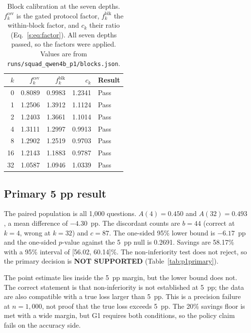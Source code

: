 \begin{table}[pos=htbp]
  \centering
  \caption{Block calibration at the seven depths. $f^{\mathrm{csv}}_k$ is the gated protocol
  factor, $f^{\mathrm{blk}}_k$ the within-block factor, and $c_k$ their ratio
  (Eq.~\ref{s:eq:factor}). All seven depths passed, so the factors were applied. Values are from
  \texttt{runs/squad\_qwen4b\_p1/blocks.json}.}
  \label{tab:p1factors}
  \small
  \setlength{\tabcolsep}{4pt}
  \begin{tabular}{rrrrl}
    \toprule
    \textbf{$k$} & \textbf{$f^{\mathrm{csv}}_k$} & \textbf{$f^{\mathrm{blk}}_k$} & \textbf{$c_k$} & \textbf{Result} \\
    \midrule
    0  & 0.8089 & 0.9983 & 1.2341 & Pass \\
    1  & 1.2506 & 1.3912 & 1.1124 & Pass \\
    2  & 1.2403 & 1.3661 & 1.1014 & Pass \\
    4  & 1.3111 & 1.2997 & 0.9913 & Pass \\
    8  & 1.2902 & 1.2519 & 0.9703 & Pass \\
    16 & 1.2143 & 1.1883 & 0.9787 & Pass \\
    32 & 1.0587 & 1.0946 & 1.0339 & Pass \\
    \bottomrule
  \end{tabular}
\end{table}

\subsection{Primary 5 pp result}

The paired population is all 1{,}000 questions. $A(4)=0.450$ and $A(32)=0.493$, a mean
difference of $-4.30$~pp. The discordant counts are $b=44$ (correct at $k=4$, wrong at $k=32$)
and $c=87$. The one-sided 95\% lower bound is $-6.17$~pp and the one-sided $p$-value against the
5~pp null is 0.2691. Savings are 58.17\% with a 95\% interval of [56.02, 60.14]\%. The
non-inferiority test does not reject, so the primary decision is \textbf{NOT SUPPORTED}
(Table~\ref{tab:p1primary}).

The point estimate lies inside the 5~pp margin, but the lower bound does not. The correct
statement is that non-inferiority is not established at 5~pp; the data are also compatible with
a true loss larger than 5~pp. This is a precision failure at $n=1{,}000$, not proof that the true
loss exceeds 5~pp. The 20\% savings floor is met with a wide margin, but G1 requires both
conditions, so the policy claim fails on the accuracy side.

